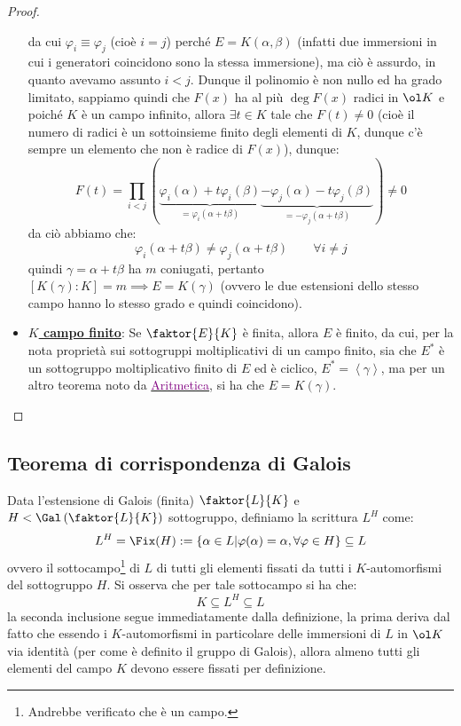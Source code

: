 \documentclass[11pt]{scrartcl}
\begin{document}
\begin{proof}
\begin{itemize}
\[            \]
        da cui $\varphi_i \equiv \varphi_j$ (cioè $i = j$) perché $E = K(\alpha,\beta)$ (infatti due immersioni in cui i generatori coincidono sono la stessa immersione), ma ciò è assurdo, in quanto avevamo assunto $i < j$. Dunque il polinomio è non nullo ed ha grado limitato, 
        sappiamo quindi che $F(x)$ ha al più $\deg F(x)$ radici in $\ol K$ e poiché $K$ è un campo infinito, allora $\exists t \in K$ tale che $F(t) \ne 0$ (cioè il numero di radici è un sottoinsieme finito degli elementi di $K$, dunque c'è sempre un elemento che non è radice di $F(x)$), dunque:
        \[ F(t) = \prod_{i<j} (\underbrace{\varphi_i(\alpha)+t\varphi_i(\beta)}_{ = \varphi_i(\alpha+t\beta)}\underbrace{-\varphi_j(\alpha)-t\varphi_j(\beta)}_{ = -\varphi_j(\alpha+t\beta)}) \ne 0
            \]
        da ciò abbiamo che:
        \[ \varphi_i(\alpha+t\beta) \ne \varphi_j(\alpha+t\beta) \qquad \forall i \ne j
            \]
        quindi $\gamma = \alpha+t\beta$ ha $m$ coniugati, pertanto $[K(\gamma) : K] = m \implies E = K(\gamma)$ (ovvero le due estensioni dello stesso campo hanno lo stesso grado e quindi coincidono).
        \item \underline{\textbf{$K$ campo finito}}: Se $\faktor{E}{K}$ è finita, allora $E$ è finito, da cui, per la nota proprietà sui sottogruppi moltiplicativi di un campo finito, sia che $E^*$ è un 
        sottogruppo moltiplicativo finito di $E$ ed è ciclico, $E^* = \left<\gamma\right>$, ma per un altro teorema noto da \href{https://github.com/diego-unipi/Appunti-Aritmetica}{\textcolor{purple}{Aritmetica}}, si ha che $E = K(\gamma)$.
        \end{itemize}
\end{proof}

\newpage
\subsection{Teorema di corrispondenza di Galois}
Data l'estensione di Galois (finita) $\faktor{L}{K}$ e $H < \Gal\left(\faktor{L}{K}\right)$ sottogruppo, definiamo la scrittura $L^H$ come:
\[ L^H = \Fix(H) := \{ \alpha \in L | \varphi(\alpha) = \alpha, \forall \varphi \in H \} \subseteq L
    \]
ovvero il sottocampo\footnote{Andrebbe verificato che è un campo.} di $L$ di tutti gli elementi fissati da tutti i $K$-automorfismi del sottogruppo $H$. Si osserva che per tale sottocampo si ha che:
\[ K \subseteq L^H \subseteq L
    \]
la seconda inclusione segue immediatamente dalla definizione, la prima deriva dal fatto che essendo i $K$-automorfismi in particolare delle immersioni di $L$ in $\ol K$ via identità (per come è definito il gruppo di Galois), allora almeno tutti gli elementi del campo $K$ devono essere fissati 
per definizione.
\end{document}

